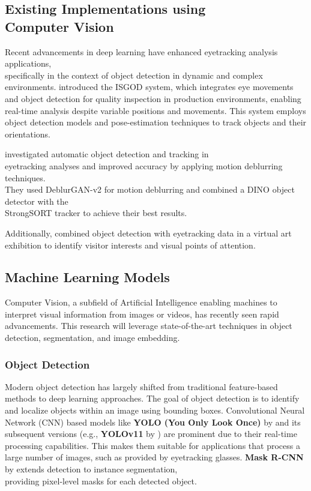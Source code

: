 \documentclass[english]{hogent-article}
\begin{document}
\subsection{Existing Implementations using\\ Computer Vision}

Recent advancements in deep learning have enhanced eyetracking analysis applications,\\ specifically in the context of object detection in dynamic and complex environments.
\textcite{Cho2024} introduced the ISGOD system, which integrates eye movements and object detection for quality inspection in production 
environments, enabling real-time analysis despite variable positions and movements. 
This system employs object detection models and pose-estimation techniques to track objects and their orientations.

\textcite{Cederin2023} investigated automatic object detection and tracking in\\ eyetracking analyses and improved accuracy by applying motion deblurring techniques.\\ 
They used DeblurGAN-v2 for motion deblurring and combined a DINO object detector with the\\ StrongSORT tracker to achieve their best results.

Additionally, \textcite{Kulyk2023} combined object detection with eyetracking data in a virtual art exhibition to identify visitor interests and visual points of attention.

\subsection{Machine Learning Models}

Computer Vision, a subfield of Artificial Intelligence enabling machines to interpret visual information from images or videos, has recently seen rapid advancements. 
This research will leverage state-of-the-art techniques in object detection, segmentation, and image embedding.

\subsubsection{Object Detection}

Modern object detection has largely shifted from traditional feature-based methods to deep learning approaches.
The goal of object detection is to identify and localize objects within an image using bounding boxes.
Convolutional Neural Network (CNN) based models like \textbf{YOLO (You Only Look Once)} by \textcite{Redmon2016} and 
its subsequent versions (e.g., \textbf{YOLOv11} by \textcite{Khanam2024}) are prominent due to their real-time processing capabilities.
This makes them suitable for applications that process a large number of images, such as provided by eyetracking glasses.
\textbf{Mask R-CNN} by \textcite{He2018} extends detection to instance segmentation,\\ providing pixel-level masks for each detected object.
\end{document}
